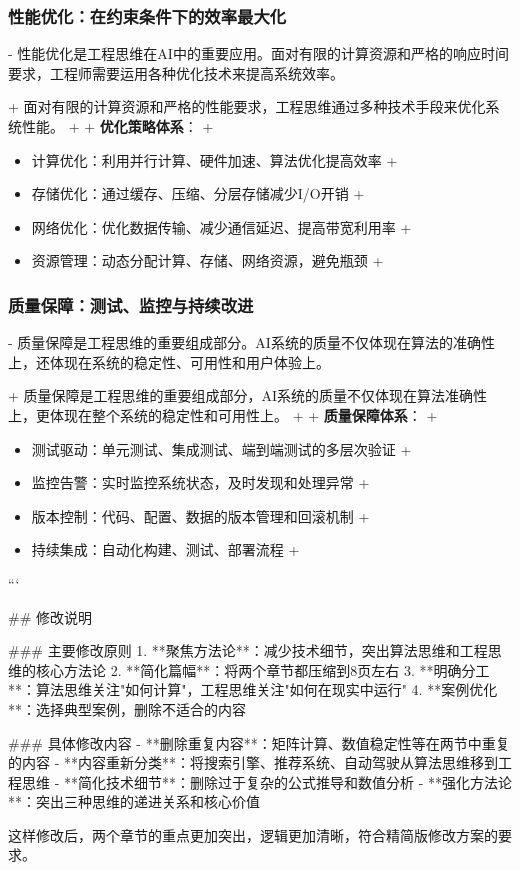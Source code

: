 \subsubsection{性能优化：在约束条件下的效率最大化}

- 性能优化是工程思维在AI中的重要应用。面对有限的计算资源和严格的响应时间要求，工程师需要运用各种优化技术来提高系统效率。

+ 面对有限的计算资源和严格的性能要求，工程思维通过多种技术手段来优化系统性能。
+
+ \textbf{优化策略体系}：
+ \begin{itemize}
+ \item 计算优化：利用并行计算、硬件加速、算法优化提高效率
+ \item 存储优化：通过缓存、压缩、分层存储减少I/O开销
+ \item 网络优化：优化数据传输、减少通信延迟、提高带宽利用率
+ \item 资源管理：动态分配计算、存储、网络资源，避免瓶颈
+ \end{itemize}

\subsubsection{质量保障：测试、监控与持续改进}

- 质量保障是工程思维的重要组成部分。AI系统的质量不仅体现在算法的准确性上，还体现在系统的稳定性、可用性和用户体验上。

+ 质量保障是工程思维的重要组成部分，AI系统的质量不仅体现在算法准确性上，更体现在整个系统的稳定性和可用性上。
+
+ \textbf{质量保障体系}：
+ \begin{itemize}
+ \item 测试驱动：单元测试、集成测试、端到端测试的多层次验证
+ \item 监控告警：实时监控系统状态，及时发现和处理异常
+ \item 版本控制：代码、配置、数据的版本管理和回滚机制
+ \item 持续集成：自动化构建、测试、部署流程
+ \end{itemize}
```

## 修改说明

### 主要修改原则
1. **聚焦方法论**：减少技术细节，突出算法思维和工程思维的核心方法论
2. **简化篇幅**：将两个章节都压缩到8页左右
3. **明确分工**：算法思维关注"如何计算"，工程思维关注"如何在现实中运行"
4. **案例优化**：选择典型案例，删除不适合的内容

### 具体修改内容
- **删除重复内容**：矩阵计算、数值稳定性等在两节中重复的内容
- **内容重新分类**：将搜索引擎、推荐系统、自动驾驶从算法思维移到工程思维
- **简化技术细节**：删除过于复杂的公式推导和数值分析
- **强化方法论**：突出三种思维的递进关系和核心价值

这样修改后，两个章节的重点更加突出，逻辑更加清晰，符合精简版修改方案的要求。